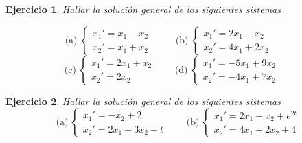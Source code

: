 \documentclass[11pt,a4paper,pdftex]{amsart}
\newtheorem{ej}{Ejercicio}%
\numberwithin{equation}{section}%
\newcommand{\bej}[1]{\begin{ej}\rm{#1}}
\newcommand{\eej}{\end{ej}\vspace{-0.2cm}}
\newcommand{\ba}{\begin{array}}
\newcommand{\ea}{\end{array}}
\newcommand{\0}{\mathbb O}
\newcommand{\8}{\infty}
\begin{document}

\bej Hallar la soluci\'on general de los siguientes sistemas

$$\text{(a)}\; \left\{\ba{l}x_1'=x_1-x_2\\ x_2'=x_1+x_2  \ea \right. \qquad
\ \ \text{(b)}\; \left\{\ba{l}x_1'=2x_1-x_2\\ x_2'=4x_1+2x_2  \ea \right. \qquad
$$
$$\ \ \ \text{(c)}\; \left\{\ba{l}x_1'=2x_1+x_2   \\ x_2'=2x_2    \ea \right. \qquad
\text{(d)}\; \left\{\ba{l}x_1'=-5x_1+9x_2\\ x_2'=-4x_1+7x_2  \ea \right. \qquad
$$

\eej

\bej Hallar la soluci\'on general de los siguientes sistemas
$$
\text{(a)}\: \left\{\ba{l}x_1'=-x_2+2\\ x_2'=2x_1+3x_2+t \ea\right.\qquad
\text{(b)} \:\left\{\ba{l} x_1'=2x_1-x_2+e^{2t}\\ x_2'=4x_1+2x_2+4 \ea\right.
$$
\eej
\end{document}
